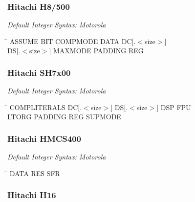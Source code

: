 \subsubsection{Hitachi H8/500}

{\em Default Integer Syntax: Motorola}

{\tt\begin{tabbing}
\hspace{3cm}\=\hspace{3cm}\=\hspace{3cm}\=\hspace{3cm}\=\kill
ASSUME          \> BIT    \> COMPMODE \> DATA   \> DC[.$<$size$>$] \\
DS[.$<$size$>$] \> MAXMODE \> PADDING \> REG \\
\end{tabbing}}

\subsubsection{Hitachi SH7x00}

{\em Default Integer Syntax: Motorola}

{\tt\begin{tabbing}
\hspace{3cm}\=\hspace{3cm}\=\hspace{3cm}\=\hspace{3cm}\=\kill
COMPLITERALS \> DC[.$<$size$>$]  \>  DS[.$<$size$>$]  \>  DSP    \> FPU     \\
LTORG        \> PADDING      \> REG          \> SUPMODE \\
\end{tabbing}}

\subsubsection{Hitachi HMCS400}

{\em Default Integer Syntax: Motorola}

{\tt\begin{tabbing}
\hspace{3cm}\=\hspace{3cm}\=\hspace{3cm}\=\hspace{3cm}\=\kill
DATA       \> RES         \> SFR \\
\end{tabbing}}

\subsubsection{Hitachi H16}

